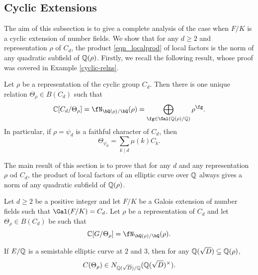 \subsection{Cyclic Extensions}

The aim of this subsection is to give a complete analysis of the case when $F/K$ is a cyclic extension of number fields. We show that for any $d\geq 2$ and representation $\rho$ of $C_d$, the product \eqref{eqn_localprod} of local factors is the norm of any quadratic subfield of $\mathbb{Q}(\rho)$. 
Firstly, we recall the following result, whose proof was covered in Example \ref{cyclic-relns}.

\begin{lemma}\label{lem_relation}
    Let $\rho$ be a representation of the cyclic group $C_d$. Then there is one unique relation $\Theta_\rho\in B(C_d)$ such that 
    $$\CC[C_d/\Theta_{\rho}]=\repnorm{\rho}=\bigoplus_{\fg\in\Gal(\QQ(\rho)/\QQ)}\rho^{\fg}.$$
    In particular, if $\rho=\psi_d$ is a faithful character of $C_d$, then
    $$\Theta_{\psi_d}=\sum_{k\mid d}\mu(k)C_k.$$
\end{lemma}




The main result of this section is to prove that for any $d$ and any representation $\rho$ od $C_d$, the product of local factors of an elliptic curve over $\mathbb{Q}$ always gives a norm of any quadratic subfield of $\mathbb{Q}(\rho)$.

\begin{thm}\label{thm_consistent_cyclic}
    Let $d\geq2$ be a positive integer and let $F/K$ be a Galois extension of number fields such that $\Gal(F/K)=C_d$. Let $\rho$ be a representation of $C_d$ and let $\Theta_\rho\in B(C_d)$ be such that
    $$\CC[G/\Theta_\rho]=\repnorm{\rho}.$$

    If $E/\mathbb{Q}$ is a semistable elliptic curve at $2$ and $3$, then for any $\mathbb{Q}(\sqrt{D})\subseteq\mathbb{Q}(\rho)$,
    $$C(\Theta_\rho)\in N_{\mathbb{Q}(\sqrt{D})/\mathbb{Q}}(\mathbb{Q}(\sqrt{D})^{\times}).$$
\end{thm}

